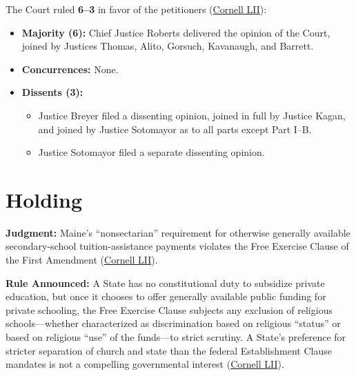 \documentclass[12pt]{article}
\begin{document}
The Court ruled \textbf{6--3} in favor of the petitioners (\href{https://www.law.cornell.edu/supremecourt/text/20-1088}{Cornell LII}):

\begin{itemize}
  \item \textbf{Majority (6):} Chief Justice Roberts delivered the opinion of the Court, joined by Justices Thomas, Alito, Gorsuch, Kavanaugh, and Barrett.
  \item \textbf{Concurrences:} None.
  \item \textbf{Dissents (3):}
    \begin{itemize}
      \item Justice Breyer filed a dissenting opinion, joined in full by Justice Kagan, and joined by Justice Sotomayor as to all parts except Part I--B.
      \item Justice Sotomayor filed a separate dissenting opinion.
    \end{itemize}
\end{itemize}

\section{Holding}

\textbf{Judgment:} Maine's ``nonsectarian'' requirement for otherwise generally available secondary-school tuition-assistance payments violates the Free Exercise Clause of the First Amendment (\href{https://www.law.cornell.edu/supremecourt/text/20-1088}{Cornell LII}).

\textbf{Rule Announced:} A State has no constitutional duty to subsidize private education, but once it chooses to offer generally available public funding for private schooling, the Free Exercise Clause subjects any exclusion of religious schools---whether characterized as discrimination based on religious ``status'' or based on religious ``use'' of the funds---to strict scrutiny. A State's preference for stricter separation of church and state than the federal Establishment Clause mandates is not a compelling governmental interest (\href{https://www.law.cornell.edu/supremecourt/text/20-1088}{Cornell LII}).
\end{document}
